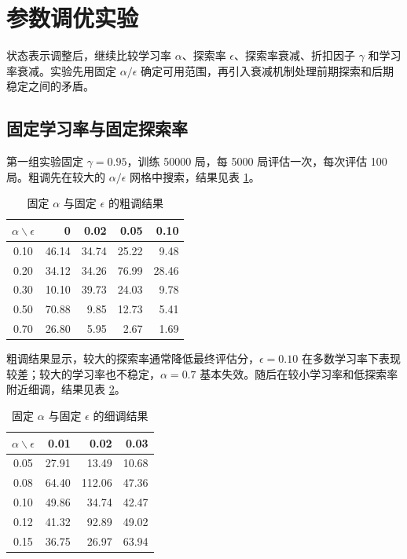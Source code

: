 \documentclass{zjureport}
\begin{document}
\clearpage

\section{参数调优实验}

状态表示调整后，继续比较学习率 $\alpha$、探索率 $\epsilon$、探索率衰减、折扣因子 $\gamma$ 和学习率衰减。实验先用固定 $\alpha/\epsilon$ 确定可用范围，再引入衰减机制处理前期探索和后期稳定之间的矛盾。

\subsection{固定学习率与固定探索率}

第一组实验固定 $\gamma=0.95$，训练 50000 局，每 5000 局评估一次，每次评估 100 局。粗调先在较大的 $\alpha/\epsilon$ 网格中搜索，结果见表 \ref{tab:alpha-epsilon-coarse}。

\begin{table}[H]
    \centering
    \small
    \caption{固定 $\alpha$ 与固定 $\epsilon$ 的粗调结果}
    \label{tab:alpha-epsilon-coarse}
    \begin{tabular}{crrrr}
        \toprule
        $\alpha \backslash \epsilon$ & 0 & 0.02 & 0.05 & 0.10 \\
        \midrule
        0.10 & 46.14 & 34.74 & 25.22 & 9.48 \\
        0.20 & 34.12 & 34.26 & 76.99 & 28.46 \\
        0.30 & 10.10 & 39.73 & 24.03 & 9.78 \\
        0.50 & 70.88 & 9.85 & 12.73 & 5.41 \\
        0.70 & 26.80 & 5.95 & 2.67 & 1.69 \\
        \bottomrule
    \end{tabular}
\end{table}

粗调结果显示，较大的探索率通常降低最终评估分，$\epsilon=0.10$ 在多数学习率下表现较差；较大的学习率也不稳定，$\alpha=0.7$ 基本失效。随后在较小学习率和低探索率附近细调，结果见表 \ref{tab:alpha-epsilon-fine}。

\begin{table}[H]
    \centering
    \small
    \caption{固定 $\alpha$ 与固定 $\epsilon$ 的细调结果}
    \label{tab:alpha-epsilon-fine}
    \begin{tabular}{crrr}
        \toprule
        $\alpha \backslash \epsilon$ & 0.01 & 0.02 & 0.03 \\
        \midrule
        0.05 & 27.91 & 13.49 & 10.68 \\
        0.08 & 64.40 & 112.06 & 47.36 \\
        0.10 & 49.86 & 34.74 & 42.47 \\
        0.12 & 41.32 & 92.89 & 49.02 \\
        0.15 & 36.75 & 26.97 & 63.94 \\
        \bottomrule
    \end{tabular}
\end{table}
\end{document}
